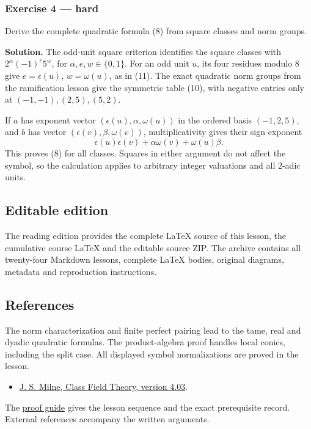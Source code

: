 \documentclass[11pt,a4paper]{article}
\newcommand{\tightlist}{\setlength{\itemsep}{0pt}\setlength{\parskip}{0pt}}
\begin{document}
\subsubsection{Exercise 4 --- hard}\label{exercise-4-hard}

Derive the complete quadratic formula (8) from square classes and norm
groups.

\textbf{Solution.} The odd-unit square criterion identifies the square
classes with \(2^\alpha(-1)^e5^w\), for \(\alpha,e,w\in\{0,1\}\). For an
odd unit \(u\), its four residues modulo 8 give \(e=\epsilon(u)\),
\(w=\omega(u)\), as in (11). The exact quadratic norm groups from the
ramification lesson give the symmetric table (10), with negative entries
only at \((-1,-1),(2,5),(5,2)\).

If \(a\) has exponent vector \((\epsilon(u),\alpha,\omega(u))\) in the
ordered basis \((-1,2,5)\), and \(b\) has vector
\((\epsilon(v),\beta,\omega(v))\), multiplicativity gives their sign
exponent \[
\epsilon(u)\epsilon(v)+\alpha\omega(v)+\omega(u)\beta.
\] This proves (8) for all classes. Squares in either argument do not
affect the symbol, so the calculation applies to arbitrary integer
valuations and all \(2\)-adic units.

\subsection{Editable edition}\label{editable-edition}

The reading edition provides the complete LaTeX source of this lesson,
the cumulative course LaTeX and the editable source ZIP. The archive
contains all twenty-four Markdown lessons, complete LaTeX bodies,
original diagrams, metadata and reproduction instructions.

\subsection{References}\label{references}

The norm characterization and finite perfect pairing lead to the tame,
real and dyadic quadratic formulas. The product-algebra proof handles
local conics, including the split case. All displayed symbol
normalizations are proved in the lesson.

\begin{itemize}
\tightlist
\item
  \href{https://www.jmilne.org/math/CourseNotes/CFT.pdf}{J. S. Milne,
  Class Field Theory, version 4.03}.
\end{itemize}

The \href{../free-proofs.html}{proof guide} gives the lesson sequence
and the exact prerequisite record. External references accompany the
written arguments.
\end{document}
